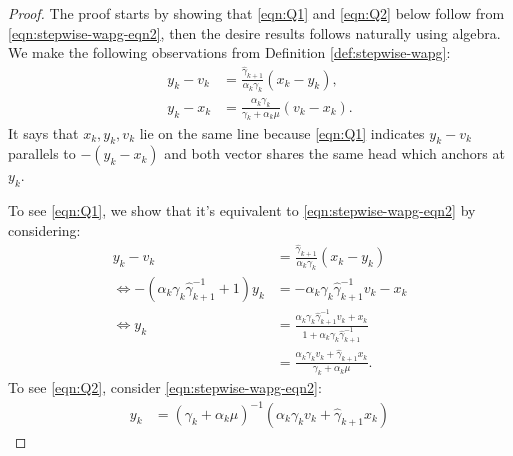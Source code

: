 \documentclass[12pt]{article}
\begin{document}
    \begin{proof}
        The proof starts by showing that \eqref{eqn:Q1} and \eqref{eqn:Q2} below 
        follow from \eqref{eqn:stepwise-wapg-eqn2}, then the desire results follows naturally using algebra.
        We make the following observations from Definition \ref{def:stepwise-wapg}:
        \begin{align*}
            y_k - v_k &=
            \frac{\hat \gamma_{k + 1}}{\alpha_k \gamma_k}(x_k - y_k),
            \tag{Q1}\label{eqn:Q1}
            \\
            y_k - x_k &=
            \frac{\alpha_k \gamma_k}{\gamma_k + \alpha_k \mu}(v_k - x_k).
            \tag{Q2}\label{eqn:Q2}
        \end{align*}
        It says that $x_k, y_k, v_k$ lie on the same line because \eqref{eqn:Q1} indicates $y_k - v_k$ parallels to $-(y_k - x_k)$ and both vector shares the same head which anchors at $y_k$.
        \par
        To see \eqref{eqn:Q1}, we show that it's equivalent to \eqref{eqn:stepwise-wapg-eqn2} by considering:
        \begin{align*}
            y_k - v_k &=
            \frac{\hat \gamma_{k + 1}}{\alpha_k \gamma_k}(x_k - y_k)
            \\
            \iff
            -(\alpha_k \gamma_k \hat \gamma^{-1}_{k + 1} + 1)y_k
            &=
            - \alpha_k \gamma_k \hat \gamma^{-1}_{k + 1}v_k - x_k
            \\
            \iff
            y_k &=
            \frac{
                \alpha_k \gamma_k \hat \gamma_{k + 1}^{-1}v_k + x_k
            }{1 + \alpha_k \gamma_k \hat \gamma_{k + 1}^{-1}}
            \\
            &=
            \frac{\alpha_k \gamma_k v_k + \hat \gamma_{k + 1} x_k}{\gamma_k + \alpha_k \mu}.
        \end{align*}
        To see \eqref{eqn:Q2}, consider \eqref{eqn:stepwise-wapg-eqn2}:
        \begin{align*}
            y_k &= (\gamma_k + \alpha_k \mu)^{-1}(\alpha_k \gamma_k v_k + \hat\gamma_{k + 1} x_k)

\end{align*}
\end{proof}
\end{document}
